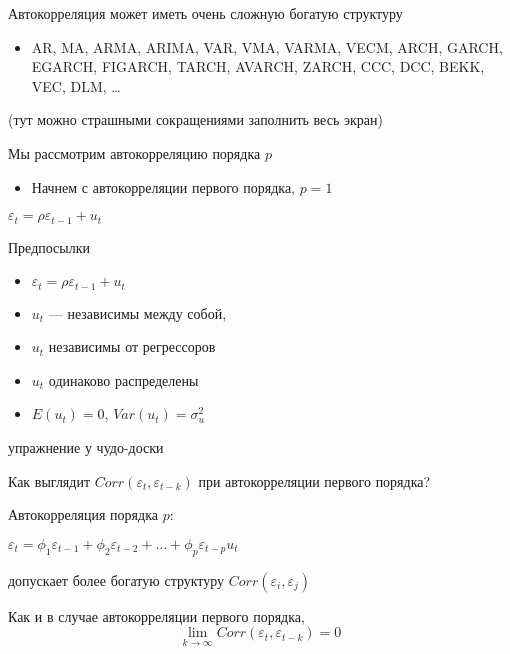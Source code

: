 \documentclass[ignorenonframetext,]{beamer}
\begin{document}
\begin{frame}{Автокорреляция может иметь очень сложную богатую
структуру}

\begin{itemize}
\itemsep1pt\parskip0pt
\item
  AR, MA, ARMA, ARIMA, VAR, VMA, VARMA, VECM, ARCH, GARCH, EGARCH,
  FIGARCH, TARCH, AVARCH, ZARCH, CCC, DCC, BEKK, VEC, DLM, \ldots{}
\end{itemize}

(тут можно страшными сокращениями заполнить весь экран)

\end{frame}

\begin{frame}{Мы рассмотрим автокорреляцию порядка $p$}

\begin{itemize}
\itemsep1pt\parskip0pt
\item
  Начнем с автокорреляции первого порядка, $p=1$
\end{itemize}

$\varepsilon_{t}=\rho \varepsilon_{t-1}+u_t$

\end{frame}

\begin{frame}{Предпосылки}

\begin{itemize}
\item
  $\varepsilon_{t}=\rho \varepsilon_{t-1}+u_t$
\item
  $u_t$ --- независимы между собой,
\item
  $u_t$ независимы от регрессоров
\item
  $u_t$ одинаково распределены
\item
  $E(u_t)=0$, $Var(u_t)=\sigma^2_u$
\end{itemize}

\end{frame}

\begin{frame}{упражнение у чудо-доски}

Как выглядит $Corr(\varepsilon_{t}, \varepsilon_{t-k})$ при
автокорреляции первого порядка?

\end{frame}

\begin{frame}{Автокорреляция порядка $p$:}

$\varepsilon_{t}=\phi_1 \varepsilon_{t-1}+\phi_2 \varepsilon_{t-2} +\ldots + \phi_p \varepsilon_{t-p}u_t$

допускает более богатую структуру $Corr(\varepsilon_i, \varepsilon_j)$

Как и в случае автокорреляции первого порядка, \[
\lim_{k\to\infty} Corr(\varepsilon_t, \varepsilon_{t-k})=0
\]

\end{frame}
\end{document}
